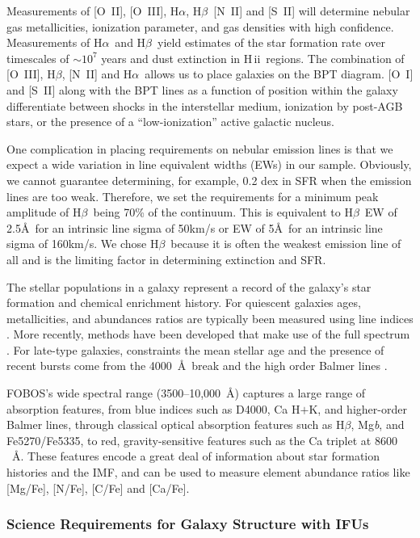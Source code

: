 \documentclass[preprint,11pt]{aastex}
\newcommand{\Halpha}{{H$\alpha$}}
\newcommand{\Hbeta}{{H$\beta$}}
\newcommand{\HII}{{\sc H\,ii}}
\begin{document}
Measurements of [O~II], [O~III], \Halpha, \Hbeta\, [N~II] and [S~II]
will determine nebular gas metallicities, ionization parameter, and
gas densities with high confidence. Measurements of \Halpha\ and
\Hbeta\ yield estimates of the star formation rate over timescales of
$\sim$$10^7$ years and dust extinction in \HII\ regions.  The
combination of [O~III], \Hbeta, [N~II] and \Halpha\ allows us to place
galaxies on the BPT diagram. [O~I] and [S~II] along with the BPT lines
as a function of position within the galaxy differentiate between
shocks in the interstellar medium, ionization by post-AGB stars, or
the presence of a ``low-ionization'' active galactic nucleus.

One complication in placing requirements on nebular emission lines is
that we expect a wide variation in line equivalent widths (EWs) in our
sample. Obviously, we cannot guarantee determining, for example, 0.2
dex in SFR when the emission lines are too weak. Therefore, we set the
requirements for a minimum peak amplitude of \Hbeta\ being 70\% of the
continuum. This is equivalent to \Hbeta\ EW of 2.5\AA\ for an
intrinsic line sigma of 50km/s or EW of 5\AA\ for an intrinsic line
sigma of 160km/s. We chose \Hbeta\ because it is often the weakest
emission line of all and is the limiting factor in determining
extinction and SFR.

The stellar populations in a galaxy represent a record of the galaxy's star formation and chemical enrichment history.   For quiescent galaxies
ages, metallicities, and abundances ratios are typically been measured
using line indices \citep[e.g.][]{johansson12}.  More recently, methods have been developed that make use of the full spectrum \citep{conroy14}.  For late-type galaxies, constraints the mean stellar age and the presence of recent bursts come from the 4000~\AA\ break and the high order Balmer lines \citep[e.g.][]{kauffmann03a}.

FOBOS's wide
spectral range (3500--10,000~\AA) captures a large range of
absorption features, from blue indices such as D4000, Ca H$+$K, and
higher-order Balmer lines, through classical optical absorption
features such as \Hbeta, Mg{\it b}, and Fe5270/Fe5335, to red,
gravity-sensitive features such as the Ca triplet at $8600$~\AA.
These features encode a great deal of information about star formation
histories and the IMF, and can be used to measure element abundance
ratios like [Mg/Fe], [N/Fe], [C/Fe] and [Ca/Fe].

\subsubsection{Science Requirements for Galaxy Structure with IFUs}
\end{document}
